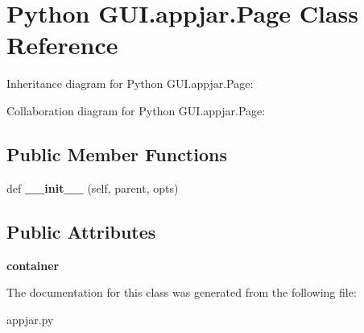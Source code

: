 \hypertarget{class_python_01_g_u_i_1_1appjar_1_1_page}{}\section{Python G\+U\+I.\+appjar.\+Page Class Reference}
\label{class_python_01_g_u_i_1_1appjar_1_1_page}


Inheritance diagram for Python G\+U\+I.\+appjar.\+Page\+:


Collaboration diagram for Python G\+U\+I.\+appjar.\+Page\+:
\subsection*{Public Member Functions}
\begin{DoxyCompactItemize}
\item 
\mbox{\label{class_python_01_g_u_i_1_1appjar_1_1_page_a80ed34bbb611fad4c3c13d53f4fd5448}} 
def {\bfseries \+\_\+\+\_\+init\+\_\+\+\_\+} (self, parent, opts)
\end{DoxyCompactItemize}
\subsection*{Public Attributes}
\begin{DoxyCompactItemize}
\item 
\mbox{\label{class_python_01_g_u_i_1_1appjar_1_1_page_ae23bced6c4cfe458f3ad2a85ab43b7ff}} 
{\bfseries container}
\end{DoxyCompactItemize}


The documentation for this class was generated from the following file\+:\begin{DoxyCompactItemize}
\item 
appjar.\+py\end{DoxyCompactItemize}
